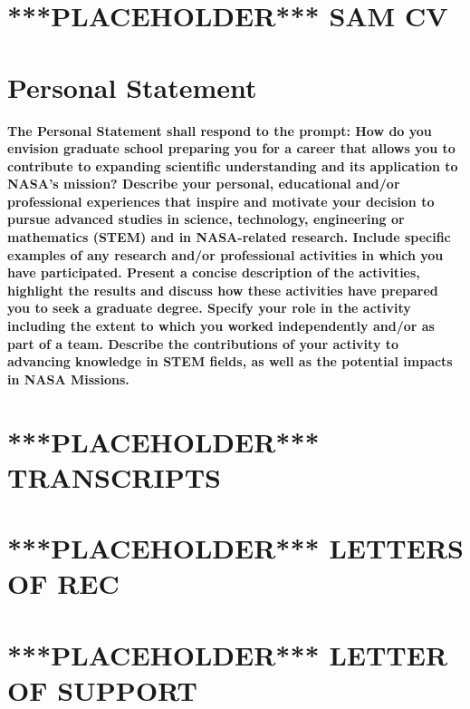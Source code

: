 \documentclass[12pt]{article}
\begin{document}
\newpage
\section{ ***PLACEHOLDER*** SAM CV }

\newpage
\section{Personal Statement}
\textbf{The Personal Statement shall respond to the
prompt: How do you envision graduate school preparing you for a career that allows you
to contribute to expanding scientific understanding and its application to NASA’s
mission? Describe your personal, educational and/or professional experiences that inspire and
motivate your decision to pursue advanced studies in science, technology, engineering
or mathematics (STEM) and in NASA-related research. Include specific examples of any
research and/or professional activities in which you have participated. Present a concise
description of the activities, highlight the results and discuss how these activities have
prepared you to seek a graduate degree. Specify your role in the activity including the
extent to which you worked independently and/or as part of a team. Describe the
contributions of your activity to advancing knowledge in STEM fields, as well as the
potential impacts in NASA Missions.}

\newpage
\section{ ***PLACEHOLDER*** TRANSCRIPTS }

\newpage
\section{ ***PLACEHOLDER*** LETTERS OF REC }

\newpage
\section{ ***PLACEHOLDER*** LETTER OF SUPPORT }
\end{document}
